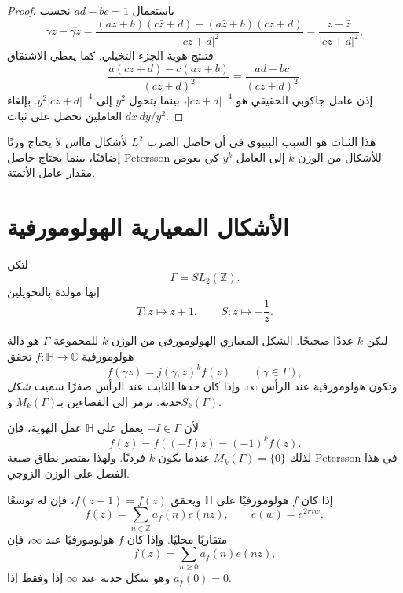 \begin{proof}
باستعمال \(ad-bc=1\) نحسب
\[
\gamma z-\overline{\gamma z}
=
\frac{(az+b)(c\bar z+d)-(a\bar z+b)(cz+d)}
{|cz+d|^2}
=\frac{z-\bar z}{|cz+d|^2},
\]
فتنتج هوية الجزء التخيلي. كما يعطي الاشتقاق
\[
\frac{a(cz+d)-c(az+b)}{(cz+d)^2}
=\frac{ad-bc}{(cz+d)^2}.
\]
إذن عامل جاكوبي الحقيقي هو \(|cz+d|^{-4}\)، بينما يتحول
\(y^2\) إلى \(y^2|cz+d|^{-4}\). بإلغاء العاملين نحصل على ثبات
\(dx\,dy/y^2\).
\end{proof}

\begin{remark}
هذا الثبات هو السبب البنيوي في أن حاصل الضرب \(L^2\) لأشكال مااس لا
يحتاج وزنًا إضافيًا، بينما يحتاج حاصل Petersson للأشكال من الوزن \(k\)
إلى العامل \(y^k\) كي يعوض مقدار عامل الأتمتة.
\end{remark}

\section{الأشكال المعيارية الهولومورفية}

لتكن
\[
\Gamma=SL_2(\mathbb Z).
\]
إنها مولدة بالتحويلين
\[
T:z\mapsto z+1,
\qquad
S:z\mapsto-\frac1z.
\]

\begin{definition}
\label{def:holomorphic-modular-cusp-form}
ليكن \(k\) عددًا صحيحًا. الشكل المعياري الهولومورفي من الوزن \(k\)
للمجموعة \(\Gamma\) هو دالة هولومورفية \(f:\mathbb H\to\mathbb C\)
تحقق
\[
f(\gamma z)=j(\gamma,z)^k f(z)
\qquad(\gamma\in\Gamma),
\]
وتكون هولومورفية عند الرأس \(\infty\). وإذا كان حدها الثابت عند الرأس
صفرًا سميت \emph{شكل حدبة}. نرمز إلى الفضاءين بـ\(M_k(\Gamma)\)
و\(S_k(\Gamma)\).
\end{definition}

\begin{remark}
لأن \(-I\in\Gamma\) يعمل على \(\mathbb H\) عمل الهوية، فإن
\[
f(z)=f((-I)z)=(-1)^k f(z).
\]
لذلك \(M_k(\Gamma)=\{0\}\) عندما يكون \(k\) فرديًا. ولهذا يقتصر
نطاق صيغة Petersson في هذا الفصل على الوزن الزوجي.
\end{remark}

\begin{lemma}
\label{lem:modular-fourier-expansion}
\provedhere
إذا كان \(f\) هولومورفيًا على \(\mathbb H\) ويحقق \(f(z+1)=f(z)\)،
فإن له توسعًا
\[
f(z)=\sum_{n\in\mathbb Z}a_f(n)e(nz),
\qquad
e(w)=e^{2\pi i w},
\]
متقاربًا محليًا. وإذا كان \(f\) هولومورفيًا عند \(\infty\)، فإن
\[
f(z)=\sum_{n\ge0}a_f(n)e(nz),
\]
وهو شكل حدبة عند \(\infty\) إذا وفقط إذا \(a_f(0)=0\).
\end{lemma}

